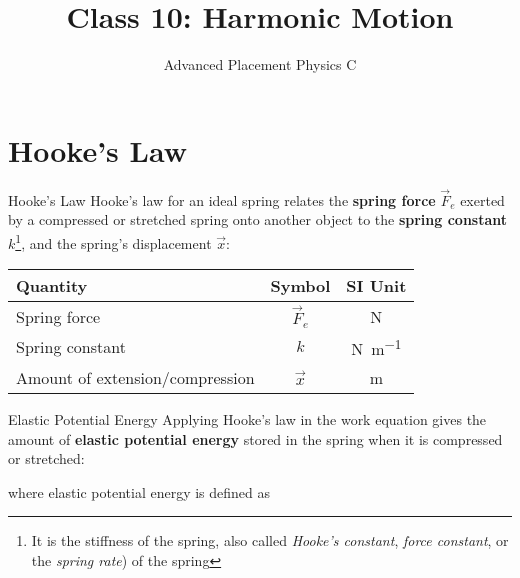\documentclass[12pt,compress,aspectratio=169]{beamer}
\title{Class 10: Harmonic Motion}
\subtitle{Advanced Placement Physics C}
\begin{document}
\begin{frame}
  \maketitle
\end{frame}


\section{Hooke's Law}

\begin{frame}{Hooke's Law}
  Hooke's law for an ideal spring relates the \textbf{spring force} $\vec F_e$
  exerted by a compressed or stretched spring onto another object to the
  \textbf{spring constant} $k$\footnote{It is the stiffness of the spring, also
    called \emph{Hooke's constant}, \emph{force constant}, or the \emph{spring
      rate}) of the spring}, and the spring's displacement $\vec x$:

  \begin{center}
    \begin{tabular}{l|c|c}
      \rowcolor{pink}
      \textbf{Quantity} & \textbf{Symbol} & \textbf{SI Unit} \\ \hline
      Spring force                    & $\vec F_e$ & \si\newton \\
      Spring constant                 & $k$        & \si{\newton\per\metre}\\
      Amount of extension/compression & $\vec x$   & \si\metre
    \end{tabular}
  \end{center}
  \vspace{.3in}
\end{frame}



\begin{frame}{Elastic Potential Energy}
  Applying Hooke's law in the work equation gives the amount of \textbf{elastic
    potential energy} stored in the spring when it is compressed or stretched:


  where elastic potential energy is defined as

\end{frame}
\end{document}
